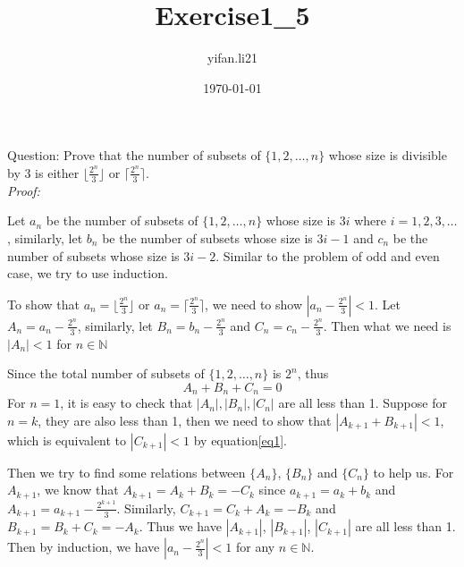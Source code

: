 \documentclass{article}
\title{Exercise1\_5}
\author{yifan.li21 }
\date{\today}
\begin{document}
\maketitle

\noindent Question: Prove that the number of subsets of $\{1,2,\ldots,n\}$ whose size is divisible by 3 is either $\lfloor\frac{2^n}{3}\rfloor$ or $\lceil\frac{2^n}{3}\rceil$.\\

\noindent\textit{Proof:}

Let $a_n$ be the number of subsets of $\{1,2,\ldots,n\}$ whose size is $3i$ where $i=1,2,3,\ldots$, similarly, let $b_n$ be the number of subsets whose size is $3i-1$ and $c_n$ be the number of subsets whose size is $3i-2$. Similar to the problem of odd and even case, we try to use induction.

To show that $a_n=\lfloor\frac{2^n}{3}\rfloor$ or $a_n=\lceil\frac{2^n}{3}\rceil$, we need to show $|a_n-\frac{2^n}{3}|<1$. Let $A_n=a_n-\frac{2^n}{3}$, similarly, let $B_n=b_n-\frac{2^n}{3}$ and $C_n=c_n-\frac{2^n}{3}$. Then what we need is $|A_n|<1$ for $n\in\mathbb{N}$

Since the total number of subsets of $\{1,2,\ldots,n\}$ is $2^n$, thus
\begin{equation}
    \label{eq1}
    A_n+B_n+C_n=0
\end{equation}
For $n=1$, it is easy to check that $|A_n|,|B_n|,|C_n|$ are all less than 1. Suppose for $n=k$, they are also less than 1, then we need to show that $|A_{k+1}+B_{k+1}|<1$, which is equivalent to $|C_{k+1}|<1$ by equation\eqref{eq1}.

Then we try to find some relations between $\{A_n\}$, $\{B_n\}$ and $\{C_n\}$ to help us. For $A_{k+1}$, we know that $A_{k+1}=A_k+B_k=-C_k$ since $a_{k+1}=a_k+b_k$ and $A_{k+1}=a_{k+1}-\frac{2^{k+1}}{3}$. Similarly, $C_{k+1}=C_k+A_k=-B_k$ and $B_{k+1}=B_k+C_k=-A_k$. Thus we have $|A_{k+1}|$, $|B_{k+1}|$, $|C_{k+1}|$ are all less than 1. Then by induction, we have $|a_n-\frac{2^n}{3}|<1$ for any $n\in\mathbb{N}$.
\end{document}
